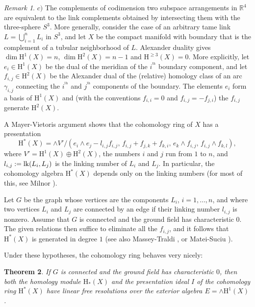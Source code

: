 \documentclass{tran-l}
\newtheorem{theorem}{Theorem}[section]
\theoremstyle{definition}
\theoremstyle{remark}
\newtheorem{remark}[theorem]{Remark}
\newcommand{\thh}{{^{\mathrm {th}}}}
\newcommand{\rH}{{\mathrm H}}
\newcommand{\link}{\mathop{\rm lk}\nolimits}
\begin{document}
\begin{remark}
$c)$ The complements of codimension two subspace arrangements in 
${\mathbb R}^{4}$ 
are equivalent to the link complements obtained
by intersecting them with the three-sphere $S^3$.
More generally, consider
the case of an arbitrary tame link $L=\bigcup_{i=1}^n L_i$ in $S^3$,
and let $X$ be the compact manifold with boundary that
is the complement of a tubular neighborhood of $L$.
Alexander duality gives
$\dim
\rH^1(X)=n$,
$\dim \rH^2(X)=n-1$ and $\rH^{\ge 3}(X)=0$.
More explicitly, let $e_i\in\rH^1(X)$ be the dual of the meridian
of the $i^\thh$ boundary component, and let
$f_{i,j}\in\rH^2(X)$ be the Alexander dual of the (relative)
homology class of an arc $\gamma_{i,j}$ connecting
the $i^\thh$ and $j^\thh$ components of the boundary.
The elements $e_i$ form a basis of $\rH^1(X)$ and
(with the conventions $f_{i,i}=0$ and $f_{i,j}=-f_{j,i}$)
the $f_{i,j}$ generate $\rH^2(X)$.

A Mayer-Vietoris argument shows
that the cohomology ring of $X$ has a presentation
\[
\rH^*(X) = \wedge V'/(e_i\wedge e_j - l_{i,j} f_{i,j},\,
f_{i,j} + f_{j,k} + f_{k,i},\, e_k\wedge f_{i,j},\, f_{i,j}\wedge f_{k,l}),
\]
where $V'=\rH^1(X)\oplus \rH^2(X)$,
the numbers $i$ and $j$ run from $1$ to $n$,
 and 
$l_{i,j}:=\link(L_i,L_j)$  is the linking number of $L_i$ and
$L_j$. In particular, the cohomology algebra
$\rH^*(X)$ depends only on the linking numbers 
(for most of this, see Milnor \cite{Mi}).

Let $G$ be the graph whose vertices are
the components $L_i$, $i=1,\ldots, n$, and where
two vertices $L_i$ and $L_j$ are connected by an edge if their
linking number $l_{i,j}$ is nonzero. Assume that $G$
is connected and the ground field has characteristic $0$. 
The given relations then suffice to eliminate all the $f_{i,j}$,
and it
follows that
$\rH^*(X)$ is generated in degree $1$ (see also
Massey-Traldi \cite[Theorem 1 and Proposition 4.1]{MT},
or Matei-Suciu \cite{MS}).
\end{remark}

Under these hypotheses, the cohomology ring behaves very
nicely:

\begin{theorem}\label{links} 
If $G$ is connected and the ground field has characteristic $0$, then
both the homology module $\rH_*(X)$ and the presentation ideal $I$ of
the cohomology ring $\rH^*(X)$ have linear free resolutions over the
exterior algebra $E=\wedge\rH^1(X)$.
\end{theorem}
\end{document}

